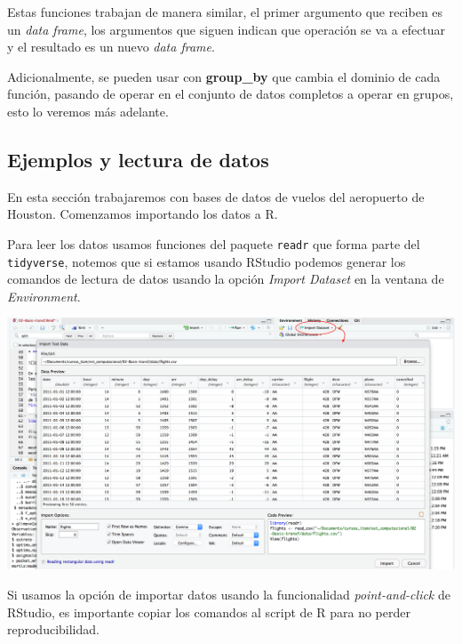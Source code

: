 \documentclass[
]{book}
\begin{document}
Estas funciones trabajan de manera similar, el primer argumento que reciben
es un \emph{data frame}, los argumentos que siguen
indican que operación se va a efectuar y el resultado es un nuevo \emph{data frame}.

Adicionalmente, se pueden usar con \textbf{group\_by} que cambia el dominio de cada
función, pasando de operar en el conjunto de datos completos a operar en
grupos, esto lo veremos más adelante.

\hypertarget{ejemplos-y-lectura-de-datos}{%
\subsection*{Ejemplos y lectura de datos}\label{ejemplos-y-lectura-de-datos}}

En esta sección trabajaremos con bases de datos de vuelos del aeropuerto de
Houston. Comenzamos importando los datos a R.

Para leer los datos usamos funciones del paquete \texttt{readr} que forma parte del
\texttt{tidyverse}, notemos que si estamos usando RStudio podemos generar los comandos
de lectura de datos usando la opción \emph{Import Dataset} en la ventana de
\emph{Environment}.

\includegraphics{imagenes/importar_RStudio.png}

Si usamos la opción de importar datos usando la funcionalidad \emph{point-and-click}
de RStudio, es importante copiar los comandos al script de R para no perder
reproducibilidad.
\end{document}
